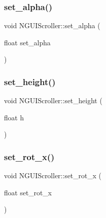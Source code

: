 \hypertarget{class_n_g_u_i_scroller_ae3b997dd113f4bfbd6bdb5e5b532ac6c}{}\label{class_n_g_u_i_scroller_ae3b997dd113f4bfbd6bdb5e5b532ac6c} 
\subsubsection{\texorpdfstring{set\+\_\+alpha()}{set\_alpha()}}
{\footnotesize\ttfamily void N\+G\+U\+I\+Scroller\+::set\+\_\+alpha (\begin{DoxyParamCaption}\item[{float}]{set\+\_\+alpha }\end{DoxyParamCaption})}

\hypertarget{class_n_g_u_i_scroller_a26f4c08a2d98797f2112f4f9030c916a}{}\label{class_n_g_u_i_scroller_a26f4c08a2d98797f2112f4f9030c916a} 
\subsubsection{\texorpdfstring{set\+\_\+height()}{set\_height()}}
{\footnotesize\ttfamily void N\+G\+U\+I\+Scroller\+::set\+\_\+height (\begin{DoxyParamCaption}\item[{float}]{h }\end{DoxyParamCaption})}

\hypertarget{class_n_g_u_i_scroller_a9fc3310d00ab18e4add174c0e55d34a8}{}\label{class_n_g_u_i_scroller_a9fc3310d00ab18e4add174c0e55d34a8} 
\subsubsection{\texorpdfstring{set\+\_\+rot\+\_\+x()}{set\_rot\_x()}}
{\footnotesize\ttfamily void N\+G\+U\+I\+Scroller\+::set\+\_\+rot\+\_\+x (\begin{DoxyParamCaption}\item[{float}]{set\+\_\+rot\+\_\+x }\end{DoxyParamCaption})}

\hypertarget{class_n_g_u_i_scroller_a7a61c9638cd009d4e90e843242800c3d}{}\label{class_n_g_u_i_scroller_a7a61c9638cd009d4e90e843242800c3d} 

